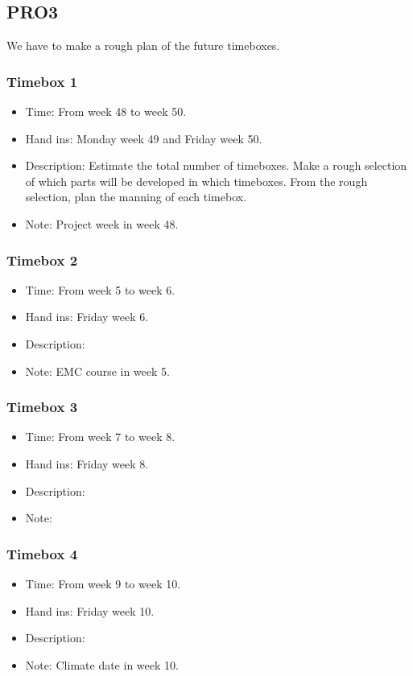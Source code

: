 \documentclass[10pt,a4paper]{article}
\begin{document}
\subsection{PRO3}
We have to make a rough plan of the future timeboxes.
\subsubsection{Timebox 1}
\begin{itemize}
\item Time: From week 48 to week 50.
\item Hand ins: Monday week 49 and Friday week 50.
\item Description: Estimate the total number of timeboxes. Make a rough selection of which parts will be developed in which timeboxes. From the rough selection, plan the manning of each timebox.
\item Note: Project week in week 48.
\end{itemize}

\subsubsection{Timebox 2}
\begin{itemize}
\item Time: From week 5 to week 6.
\item Hand ins: Friday week 6.
\item Description:
\item Note: EMC course in week 5.
\end{itemize}

\subsubsection{Timebox 3}
\begin{itemize}
\item Time: From week 7 to week 8.
\item Hand ins: Friday week 8.
\item Description:
\item Note:
\end{itemize}

\subsubsection{Timebox 4}
\begin{itemize}
\item Time: From week 9 to week 10.
\item Hand ins: Friday week 10.
\item Description:
\item Note: Climate date in week 10.
\end{itemize}
\end{document}
